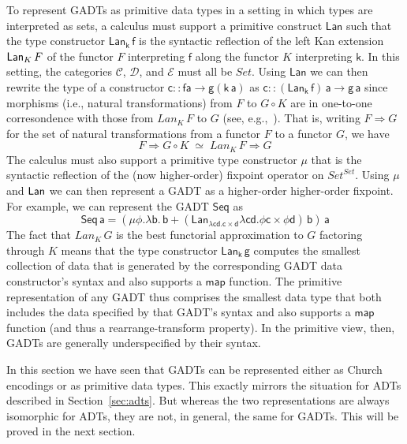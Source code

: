\documentclass[acmsmall,screen,review,anonymous]{acmart}
\theoremstyle{definition}
\begin{document}
To represent GADTs as primitive data types in a setting in which types
are interpreted as sets, a calculus must support a primitive construct
$\mathsf{Lan}$ such that the type constructor $\mathsf{Lan_k\,f}$ is
the syntactic reflection of the left Kan extension $\mathsf{Lan}_K \,F$ of the
functor $F$ interpreting $\mathsf{f}$ along the functor $K$
interpreting $\mathsf{k}$. In this setting, the categories
$\mathcal{C}$, $\mathcal{D}$, and $\mathcal{E}$ must all be
$\mathit{Set}$. Using $\mathsf{Lan}$ we can then rewrite the type of a
constructor $\mathsf{c :: f a \to g(k\,a)}$ as $\mathsf{c ::
  (Lan_k\,f)\,a \to g\,a}$ since morphisms (i.e., natural
transformations) from $F$ to $G \circ K$ are in one-to-one
corresondence with those from $\mathit{Lan}_K\,F$ to $G$ (see,
e.g.,~\cite{rie16}). That is, writing $F \Rightarrow G$ for the set of
natural transformations from a functor $F$ to a functor $G$, we have
\begin{equation}\label{eq:nat-transfs}
F \Rightarrow G \circ K\; \simeq \; Lan_K\,F \Rightarrow G
\end{equation}
The calculus must also support a primitive type
constructor $\mathsf{\mu}$ that is the syntactic reflection of the
(now higher-order) fixpoint operator on
$\mathit{Set}^\mathit{Set}$. Using $\mu$ and $\mathsf{Lan}$ we can then
represent a GADT as a higher-order higher-order fixpoint. For example,
we can represent the GADT $\mathsf{Seq}$ as
\[\mathsf{Seq\,a} = \mathsf{(\mu \phi.\lambda b.\, b + (Lan_{\lambda c
    d. c \times d} \lambda c d. \phi c \times \phi d)\,b)\,a}\] The
fact that $Lan_K\,G$ is the best functorial approximation to $G$
factoring through $K$ means that the type constructor
$\mathsf{Lan_k\,g}$ computes the smallest collection of data that is
generated by the corresponding GADT data constructor's syntax and also
supports a $\mathsf{map}$ function. The primitive representation of
any GADT thus comprises the smallest data type that both includes the
data specified by that GADT's syntax and also supports a
$\mathsf{map}$ function (and thus a rearrange-transform property). In
the primitive view, then, GADTs are generally underspecified by their
syntax.

In this section we have seen that GADTs can be represented either as
Church encodings or as primitive data types. This exactly mirrors the
situation for ADTs described in Section~\ref{sec:adts}. But whereas
the two representations are always isomorphic for ADTs, they are not,
in general, the same for GADTs. This will be proved in the next
section.
\end{document}
